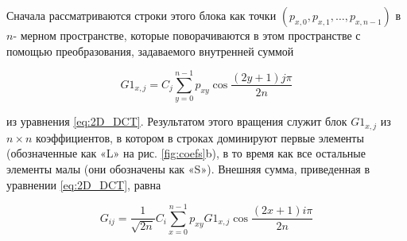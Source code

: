 Сначала рассматриваются строки этого блока как точки $(p_{x,0}, p_{x,1}, \dots, p_{x,n-1})$ в $n$- мерном пространстве,
которые поворачиваются в этом пространстве с помощью преобразования, задаваемого внутренней суммой

$$
G1_{x,j} = C_j \sum_{y=0}^{n-1} p_{xy} \cos{\frac{(2y+1)j \pi}{2n}}
$$


из уравнения \eqref{eq:2D_DCT}. Результатом этого вращения служит блок $G1_{x,j}$ из $n \times n$ коэффициентов, 
в котором в строках доминируют первые элементы (обозначенные как «L» на рис. \eqref{fig:coefs}b), 
в то время как все остальные элементы малы (они обозначены как «S»). Внешняя сумма, приведенная в уравнении \eqref{eq:2D_DCT}, равна


$$
G_{ij} = \frac{1}{\sqrt{2n}} C_i \sum_{x=0}^{n-1} p_{xy} G1_{x,j} \cos{\frac{(2x+1)i \pi}{2n}}
$$